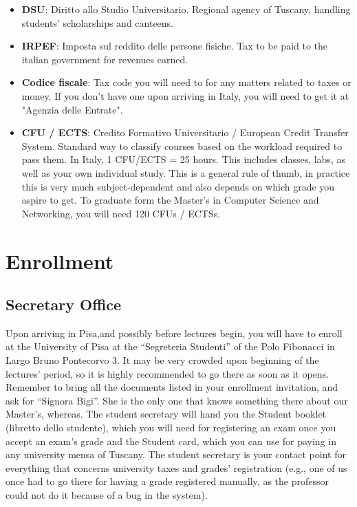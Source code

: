 \documentclass[11pt,fleqn,oneside]{book} %
\begin{document}
\begin{itemize}

	\item \textbf{DSU}: Diritto allo Studio Universitario. Regional agency of Tuscany, handling students' scholarships and canteens. 
	\item \textbf{IRPEF}: Imposta sul reddito delle persone fisiche. Tax to be paid to the italian government for revenues earned. 
	\item \textbf{Codice fiscale}: Tax code you will need to for any matters related to taxes or money. If you don't have one upon arriving in Italy, you will need to get it at "Agenzia delle Entrate". 
	
	\item \textbf{CFU / ECTS}: Credito Formativo Universitario / European Credit Transfer System. Standard way to classify courses based on the workload required to pass them. In Italy, 1 CFU/ECTS  = 25 hours. This includes classes, labs, as well as your own individual study. This is a general rule of thumb, in practice this is very much subject-dependent and also depends on which grade you aspire to get. To graduate form the Master's in Computer Science and Networking, you will need 120 CFUs / ECTSs. 
\end{itemize}



\chapter{Enrollment}


\section{Secretary Office}

Upon arriving in Pisa,and possibly before lectures begin, you will have to enroll at the University of Pisa at the “Segreteria Studenti” of the Polo Fibonacci in Largo Bruno Pontecorvo 3. It may be very crowded upon beginning of the lectures’ period, so it is highly recommended to go there as soon as it opens. Remember to bring all the documents listed in your enrollment invitation, and ask for “Signora Bigi”. She is the only one that knows something there about our Master’s, whereas.
The student secretary will hand you the Student booklet (libretto dello studente), which you will need for registering an exam once you accept an exam’s grade and the Student card, which you can use for paying in any university mensa of Tuscany. The student secretary is your contact point for everything that concerns university taxes and grades’ registration (e.g., one of us once had to go there for having a grade registered manually, as the professor could not do it because of a bug in the system). 
\end{document}
